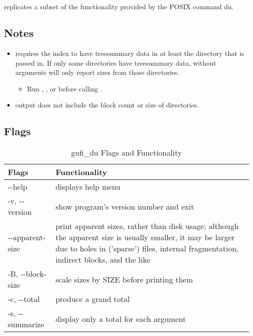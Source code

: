\section{\gufidu}
\gufidu replicates a subset of the functionality provided by the POSIX
command du.

\subsection{Notes}
\begin{itemize}
\item \gufidu requires the index to have treesummary data in at least
  the directory that is passed in. If only some directories have
  treesummary data, \gufidu without arguments will only report sizes
  from those directories.
  \begin{itemize}
  \item Run \gufitreesummary, \gufitreesummaryall, or \gufirollup
    before calling \gufidu.
  \end{itemize}
\item \gufidu output does not include the block count or size of
  directories.
\end{itemize}

\subsection{Flags}
\begin{table} [h!]
  \centering
  \begin{tabularx}{\textwidth}{| l | X |}
    \hline
    Flags & Functionality \\
    \hline
    -{}-help & displays help menu \\
    \hline
    -v, -{}-version & show program's version number and exit \\
    \hline
    -{}-apparent-size & print apparent sizes, rather than disk usage;
    although the apparent size is usually smaller, it may be larger
    due to holes in ('sparse') files, internal fragmentation, indirect
    blocks, and the like \\
    \hline
    -B, -{}-block-size & scale sizes by SIZE before printing them \\
    \hline
    -c, -{}-total & produce a grand total \\
    \hline
    -s, -{}-summarize & display only a total for each argument \\
    \hline
  \end{tabularx}
  \caption{\label{fig:gufi_du flags}{gufi\_du Flags and Functionality}}
\end{table}

